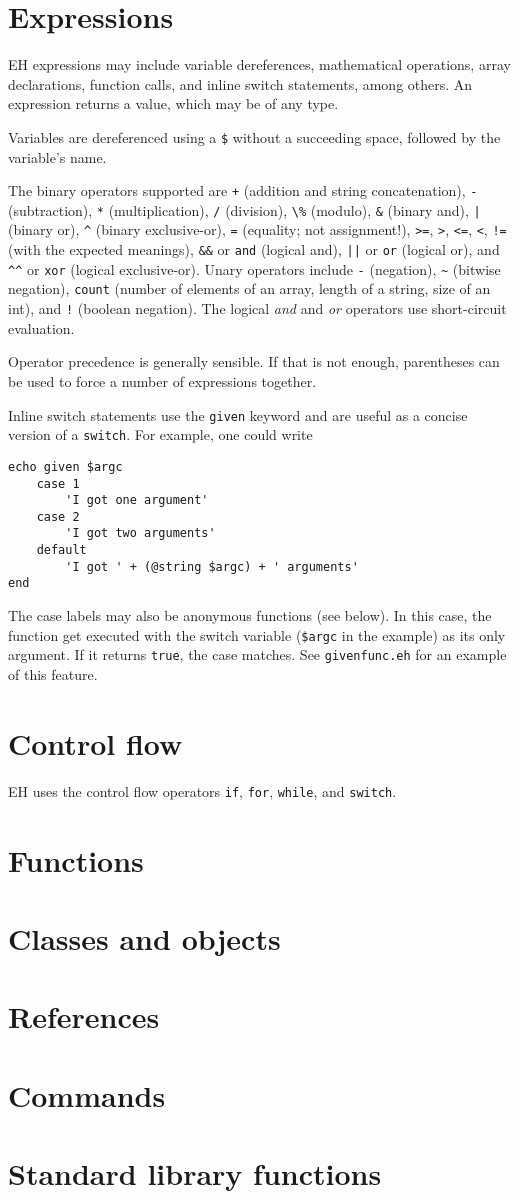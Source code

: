 \documentclass{article}
\begin{document}
\section{Expressions}
EH expressions may include variable dereferences, mathematical operations, array declarations, function calls, and inline switch statements, among others. 
An expression returns a value, which may be of any type.

Variables are dereferenced using a \verb#$# without a succeeding space, followed by the variable's name.

The binary operators supported are \verb#+# (addition and string concatenation), \verb#-# (subtraction), \verb#*# (multiplication), \verb#/# (division), \verb#\%# (modulo), \verb#&# (binary and), \verb#|# (binary or), \verb#^# (binary exclusive-or), \verb#=# (equality; not assignment!), \verb#>=#, \verb#>#, \verb#<=#, \verb#<#, \verb#!=# (with the expected meanings), \verb#&&# or \verb#and# (logical and), \verb#||# or \verb#or# (logical or), and \verb#^^# or \verb#xor# (logical exclusive-or). 
Unary operators include \verb#-# (negation), \verb#~# (bitwise negation), \verb#count# (number of elements of an array, length of a string, size of an int), and \verb#!# (boolean negation). 
The logical \textit{and} and \textit{or} operators use short-circuit evaluation.

Operator precedence is generally sensible.
If that is not enough, parentheses can be used to force a number of expressions together.

Inline switch statements use the \verb#given# keyword and are useful as a concise version of a \verb#switch#. 
For example, one could write
\begin{verbatim}
echo given $argc
	case 1
		'I got one argument'
	case 2
		'I got two arguments'
	default
		'I got ' + (@string $argc) + ' arguments'
end
\end{verbatim}
The case labels may also be anonymous functions (see below).
In this case, the function get executed with the switch variable (\verb#$argc# in the example) as its only argument. 
If it returns \verb#true#, the case matches.
See \verb#givenfunc.eh# for an example of this feature.

\section{Control flow}
EH uses the control flow operators \verb#if#, \verb#for#, \verb#while#, and \verb#switch#. 
\section{Functions}

\section{Classes and objects}

\section{References}

\section{Commands}

\section{Standard library functions}
\end{document}
